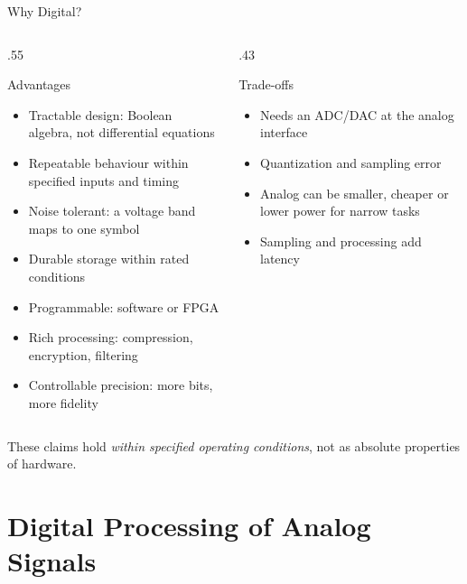 \documentclass[9pt,aspectratio=169,xcolor=table]{beamer}
\begin{document}
\begin{frame}{Why Digital?}
  \begin{columns}[t]
  \begin{column}{.55\textwidth}
    \begin{block}{Advantages}
    {\small
    \begin{itemize}\itemsep1pt
      \item \alert{Tractable design}: Boolean algebra, not differential equations
      \item \alert{Repeatable} behaviour within specified inputs and timing
      \item \alert{Noise tolerant}: a voltage band maps to one symbol
      \item \alert{Durable storage} within rated conditions
      \item \alert{Programmable}: software or FPGA
      \item \alert{Rich processing}: compression, encryption, filtering
      \item \alert{Controllable precision}: more bits, more fidelity
    \end{itemize}}
    \end{block}
  \end{column}
  \begin{column}{.43\textwidth}
    \begin{alertblock}{Trade-offs}
    {\small
    \begin{itemize}\itemsep1pt
      \item Needs an ADC/DAC at the analog interface
      \item Quantization and sampling error
      \item Analog can be smaller, cheaper or lower power for narrow tasks
      \item Sampling and processing add latency
    \end{itemize}}
    \end{alertblock}
  \end{column}
  \end{columns}
  \vspace{2mm}
  {\footnotesize These claims hold \emph{within specified operating conditions}, not as absolute properties of hardware.}
\end{frame}

\section{Digital Processing of Analog Signals}
\end{document}
